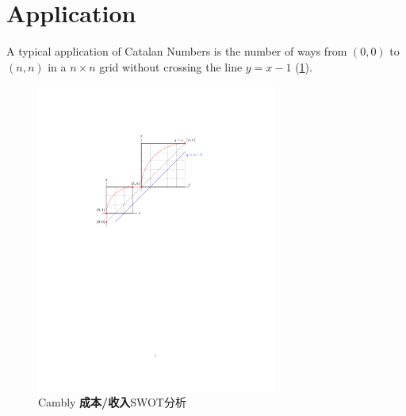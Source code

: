 \section{Application}

A typical application of Catalan Numbers is the number of ways from $(0, 0)$ to $(n, n)$ in a $n \times n$ grid without crossing the line $y = x-1$ (\ref*{fig:basic}).

\begin{figure}[H]
    \centering
    \includegraphics[width=0.7\textwidth]{figures/recurrence.pdf}
    \caption{Cambly \textbf{成本/收入}SWOT分析}\label{fig:basic}
\end{figure}  